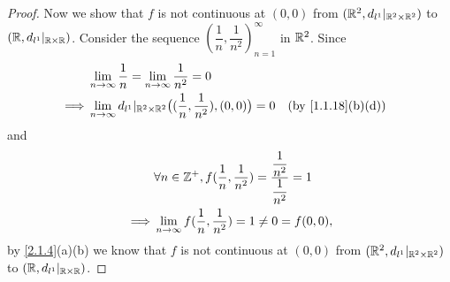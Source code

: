 \begin{proof}
  Now we show that \(f\) is not continuous at \((0, 0)\) from \((\mathbb{R}^2, d_{l^1}|_{\mathbb{R}^2 \times \mathbb{R}^2})\) to \((\mathbb{R}, d_{l^1}|_{\mathbb{R} \times \mathbb{R}})\).
  Consider the sequence \((\dfrac{1}{n}, \dfrac{1}{n^2})_{n = 1}^\infty\) in \(\mathbb{R}^2\).
  Since
  \begin{align*}
             & \lim_{n \to \infty} \dfrac{1}{n} = \lim_{n \to \infty} \dfrac{1}{n^2} = 0                                                                \\
    \implies & \lim_{n \to \infty} d_{l^1}|_{\R^2 \times \R^2}\big((\dfrac{1}{n}, \dfrac{1}{n^2}), (0, 0)\big) = 0 &  & \text{(by \cref{1.1.18}(b)(d))}
  \end{align*}
  and
  \begin{align*}
             & \forall n \in \mathbb{Z}^+, f(\dfrac{1}{n}, \dfrac{1}{n^2}) = \dfrac{\dfrac{1}{n^2}}{\dfrac{1}{n^2}} = 1 \\
    \implies & \lim_{n \to \infty} f(\dfrac{1}{n}, \dfrac{1}{n^2}) = 1 \neq 0 = f(0, 0),
  \end{align*}
  by \cref{2.1.4}(a)(b) we know that \(f\) is not continuous at \((0, 0)\) from \((\mathbb{R}^2, d_{l^1}|_{\mathbb{R}^2 \times \mathbb{R}^2})\) to \((\mathbb{R}, d_{l^1}|_{\mathbb{R} \times \mathbb{R}})\).
\end{proof}